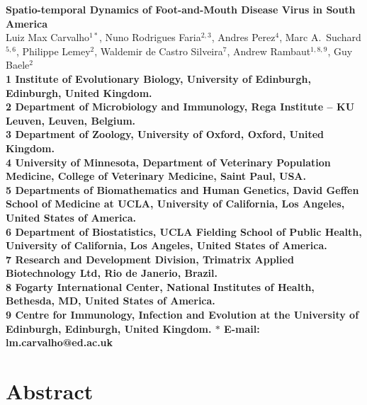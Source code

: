 \documentclass[10pt]{article}
\date{}
\begin{document}
\begin{flushleft}
{\Large
\textbf{Spatio-temporal Dynamics of Foot-and-Mouth Disease Virus in South America}
}
\\
Luiz Max Carvalho$^{1\ast}$,
Nuno Rodrigues Faria$^{2,3}$,
Andres Perez$^{4}$,
Marc A.~Suchard$^{5,6}$,
Philippe Lemey$^{2}$,
Waldemir de Castro Silveira$^{7}$,
Andrew Rambaut$^{1,8,9}$,
Guy Baele$^{2}$
\\
\bf{1} Institute of Evolutionary Biology, University of Edinburgh, Edinburgh, United Kingdom.\\
\bf{2} Department of Microbiology and Immunology, Rega Institute -- KU Leuven, Leuven, Belgium.\\
\bf{3} Department of Zoology, University of Oxford, Oxford, United Kingdom.\\
\bf{4} University of Minnesota, Department of Veterinary Population Medicine, College of Veterinary Medicine, Saint Paul, USA.\\
\bf{5} Departments of Biomathematics and Human Genetics, David Geffen School of Medicine at UCLA, University of California, Los Angeles,  United States of America.\\
\bf{6} Department of Biostatistics, UCLA Fielding School of Public Health, University of California, Los Angeles,  United States of America.\\
\bf{7} Research and Development Division, Trimatrix Applied Biotechnology Ltd, Rio de Janerio, Brazil.\\
\bf{8} Fogarty International Center, National Institutes of Health, Bethesda, MD,  United States of America.\\
\bf{9} Centre for Immunology, Infection and Evolution at the University of Edinburgh, Edinburgh, United Kingdom.
$\ast$ E-mail: lm.carvalho@ed.ac.uk
\end{flushleft}
\section*{Abstract}

\end{document}
